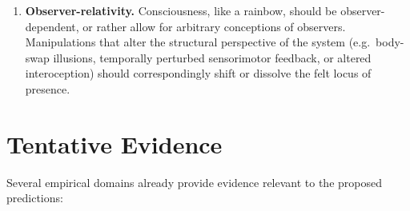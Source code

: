 \documentclass[12pt]{article}
\begin{document}
\begin{enumerate}
    \item \textbf{Observer-relativity.} Consciousness, like a rainbow, should be
    observer-dependent, or rather allow for arbitrary conceptions of observers. 
    Manipulations that alter the structural perspective of the system 
    (e.g.\ body-swap illusions, temporally perturbed sensorimotor feedback, or
    altered interoception) should correspondingly shift or dissolve the felt locus of
    presence.
\end{enumerate}

\section*{Tentative Evidence}

Several empirical domains already provide evidence relevant to the proposed predictions:
\end{document}
